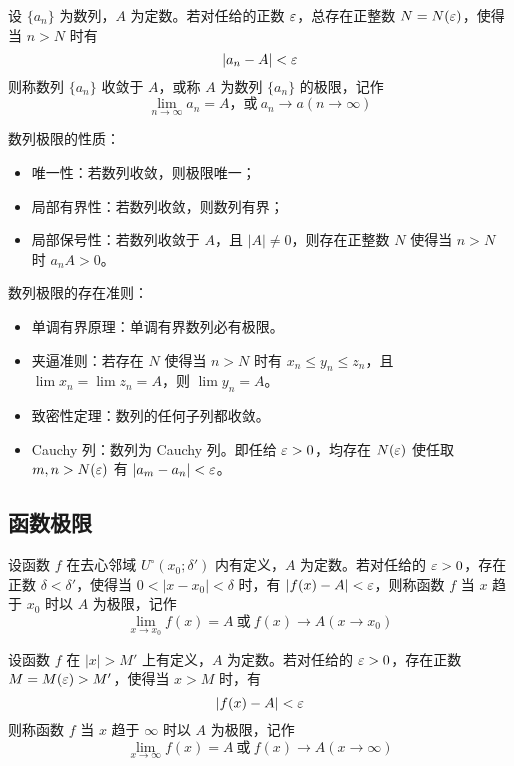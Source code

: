 \begin{definition}
	设 $\{a_n\}$ 为数列，$A$ 为定数。若对任给的正数 $\varepsilon$，总存在正整数 $N=N(\varepsilon)$，使得当 $n>N$ 时有
	\[|a_n - A| < \varepsilon\]
	则称数列 $\{a_n\}$ 收敛于 $A$，或称 $A$ 为数列 $\{a_n\}$ 的极限，记作
	\[\lim\limits_{n\to \infty} a_n = A \text{，或}\ a_n \to a(n \to \infty)\]
\end{definition}

数列极限的性质：

\begin{itemize}
	\item 唯一性：若数列收敛，则极限唯一；
	\item 局部有界性：若数列收敛，则数列有界；
	\item 局部保号性：若数列收敛于 $A$，且 $|A| \neq 0$，则存在正整数 $N$ 使得当 $n > N$ 时 $a_n A > 0$。
\end{itemize}

数列极限的存在准则：

\begin{itemize}
	\item 单调有界原理：单调有界数列必有极限。
	\item 夹逼准则：若存在 $N$ 使得当 $n > N$ 时有 $x_n \leqslant y_n \leqslant z_n$，且 $\lim x_n = \lim z_n = A$，则 $\lim y_n = A$。
	\item 致密性定理：数列的任何子列都收敛。
	\item Cauchy 列：数列为 Cauchy 列。即任给 $\varepsilon>0$，均存在 $N(\varepsilon)$ 使任取 $m,n>N(\varepsilon)$ 有 $|a_m-a_n| < \varepsilon$。
\end{itemize}

\subsection{函数极限}

\begin{definition}
	设函数 $f$ 在去心邻域 $U^\circ(x_0;\delta')$ 内有定义，$A$ 为定数。若对任给的 $\varepsilon>0$，存在正数 $\delta<\delta'$，使得当 $0<|x-x_0|<\delta$ 时，有 $|f(x)-A|<\varepsilon$，则称函数 $f$ 当 $x$ 趋于 $x_0$ 时以 $A$ 为极限，记作
	\[ \lim_{x \to x_0}f(x) = A\ \text{或}\ f(x)\to A(x \to x_0) \]
\end{definition}

\begin{definition}
	设函数 $f$ 在 $|x| > M'$ 上有定义，$A$ 为定数。若对任给的 $\varepsilon>0$，存在正数 $M=M(\varepsilon) > M'$，使得当 $x>M$ 时，有
	\[ |f(x)-A| < \varepsilon \]
	则称函数 $f$ 当 $x$ 趋于 $\infty$ 时以 $A$ 为极限，记作
	\[ \lim_{x \to \infty}f(x) = A\ \text{或}\ f(x) \to A(x \to \infty) \]
\end{definition}

